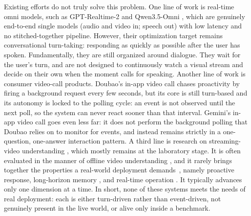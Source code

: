 Existing efforts do not truly solve this problem. One line of work is real-time omni models, such as GPT-Realtime-2 \cite{openai2026gptrealtime2} and Qwen3.5-Omni \cite{qwen2026omni}, which are genuinely end-to-end single models (audio and video in; speech out) with low latency and no stitched-together pipeline. 
However, their optimization target remains conversational turn-taking: responding as quickly as possible after the user has spoken. Fundamentally, they are still organized around dialogue. They wait for the user's turn, and are not designed to continuously watch a visual stream and decide on their own when the moment calls for speaking.
Another line of work is consumer video-call products. Doubao's in-app video call \cite{seed2_2026} chases proactivity by firing a background request every few seconds, but its core is still turn-based and its autonomy is locked to the polling cycle: an event is not observed until the next poll, so the system can never react sooner than that interval.
Gemini's in-app video call \cite{gemini31flashlive} goes even less far: it does not perform the background polling that Doubao relies on to monitor for events, and instead remains strictly in a one-question, one-answer interaction pattern.
A third line is research on streaming-video understanding \cite{qian2025dispider,qian2025streaming,videollm-online,wang2024mmduet,yan2026proactvl,guan2026videostreamingthinking,awesomevlmstreaming}, which mostly remains at the laboratory stage. It is often evaluated in the manner of offline video understanding \cite{li2025ovobenchfarvideollmsrealworld,lin2024streamingbenchassessinggapmllms}, and it rarely brings together the properties a real-world deployment demands~\cite{yao2026harnessingstreamingvideowild}, namely proactive response\cite{xia2025streamingvideoinstructiontuning,qian2025dispider,yan2026proactvl}, long-horizon memory \cite{yao2025timechatonline,zhang2026hermeskvcachehierarchical,zeng2026streamforest}, and real-time operation \cite{xu2025streamingvlmrealtimeunderstandinginfinite,wang2026acceleratingstreamingvideolarge}. 
It typically advances only one dimension at a time. In short, none of these systems meets the needs of real deployment: each is either turn-driven rather than event-driven, not genuinely present in the live world, or alive only inside a benchmark.


